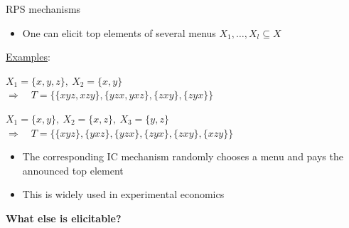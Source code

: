 \begin{frame}{RPS mechanisms}{}

\begin{itemize}
\item One can elicit top elements of several menus $X_1,\ldots,X_l\subseteq X$
\end{itemize}

\underline{Examples}:

\smallskip

$X_1=\{x,y,z\},~ X_2=\{x,y\}$\\
$\Longrightarrow~~~$ $T=\{ \{xyz, xzy\}, \{yzx, yxz\}, \{zxy\}, \{zyx\} \}$

\bigskip

$X_1=\{x,y\},~ X_2=\{x,z\},~ X_3=\{y,z\}$\\
$\Longrightarrow~~~$ $T=\{ \{xyz\}, \{yxz\}, \{yzx\}, \{zyx\}, \{zxy\}, \{xzy\} \}$


\bigskip

\begin{itemize}
\item The corresponding IC mechanism randomly chooses a menu and pays the announced top element

\bigskip

\item This is widely used in experimental economics
\end{itemize}

\pause

\bigskip

\textbf{What else is elicitable?}

\end{frame}



